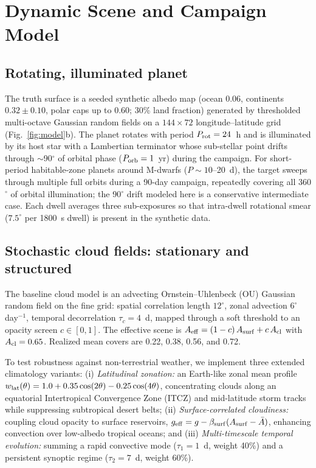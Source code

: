 \documentclass[twocolumn,10pt]{article}
\begin{document}
\section{Dynamic Scene and Campaign Model}
\label{sec:scene}

\subsection{Rotating, illuminated planet}
The truth surface is a seeded synthetic albedo map (ocean 0.06,
continents $0.32\pm0.10$, polar caps up to 0.60; 30\% land fraction)
generated by thresholded multi-octave Gaussian random fields on a
$144\times72$ longitude--latitude grid (Fig.~\ref{fig:model}b). The planet
rotates with period $P_{\rm rot}=24$~h and is illuminated by its host star
with a Lambertian terminator whose sub-stellar point drifts through
$\sim$90$^\circ$ of orbital phase ($P_{\rm orb}=1$~yr) during the campaign.
For short-period habitable-zone planets around M-dwarfs ($P\sim10$--20~d),
the target sweeps through multiple full orbits during a 90-day campaign,
repeatedly covering all 360$^\circ$ of orbital illumination; the 90$^\circ$
drift modeled here is a conservative intermediate case.
Each dwell averages three sub-exposures so that intra-dwell rotational
smear ($7.5^\circ$ per 1800~s dwell) is present in the synthetic data.

\subsection{Stochastic cloud fields: stationary and structured}
The baseline cloud model is an advecting Ornstein--Uhlenbeck (OU) Gaussian
random field on the fine grid: spatial correlation length $12^\circ$,
zonal advection $6^\circ$\,day$^{-1}$, temporal decorrelation $\tau_c=4$~d,
mapped through a soft threshold to an opacity screen $c\in[0,1]$. The
effective scene is $A_{\rm eff}=(1-c)\,A_{\rm surf}+c\,A_{\rm cl}$ with
$A_{\rm cl}=0.65$. Realized mean covers are 0.22, 0.38, 0.56, and 0.72.

To test robustness against non-terrestrial weather, we implement three
extended climatology variants:
(i) {\it Latitudinal zonation:} an Earth-like zonal mean profile
$w_{\rm lat}(\theta)=1.0+0.35\cos(2\theta)-0.25\cos(4\theta)$, concentrating
clouds along an equatorial Intertropical Convergence Zone (ITCZ) and
mid-latitude storm tracks while suppressing subtropical desert belts;
(ii) {\it Surface-correlated cloudiness:} coupling cloud opacity to surface
reservoirs, $g_{\rm eff}=g-\beta_{\rm surf}(A_{\rm surf}-\bar{A})$, enhancing
convection over low-albedo tropical oceans; and
(iii) {\it Multi-timescale temporal evolution:} summing a rapid convective
mode ($\tau_1=1$~d, weight 40\%) and a persistent synoptic regime
($\tau_2=7$~d, weight 60\%).
\end{document}
